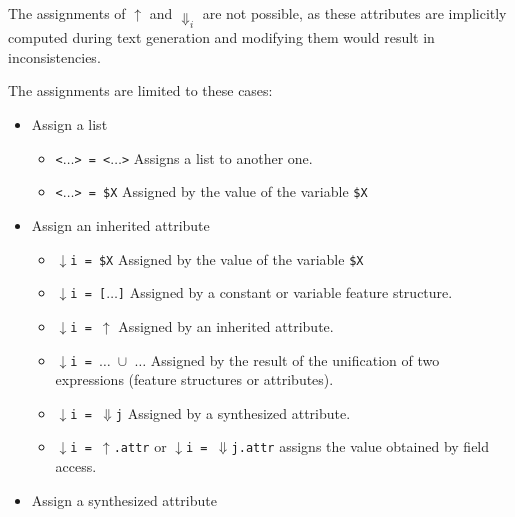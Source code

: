 \documentclass[11pt]{article}
\begin{document}
\begin{itemize}
	      The assignments of $\uparrow$ and $\Downarrow_i$ are not
	      possible, as these attributes are implicitly computed during text
	      generation and modifying them would result in
	      inconsistencies.

	      The assignments are limited to these cases:
	      \begin{itemize}

		      \item Assign a list

		            \begin{itemize}
			            \item  \verb#<#$\dots$\verb#> = <#$\dots$\verb#># Assigns a list to
			                  another one.
			            \item \verb#<#$\dots$\verb#> = $X# Assigned by the value of the
			                  variable \verb#$X#
		            \end{itemize}

		      \item Assign an inherited attribute

		            \begin{itemize}
			            \item $\downarrow$\verb#i = $X# Assigned by the value of the
			                  variable \verb#$X#
			            \item $\downarrow$\verb#i = [#$\dots$\verb#]# Assigned by a
			                  constant or variable feature structure.
			            \item $\downarrow$\verb#i = #$\uparrow$ Assigned by an inherited attribute.
			            \item $\downarrow$\verb#i = #$\dots$\verb# #$\cup$\verb# #$\dots$
			                  Assigned by the result of the unification of two expressions
			                  (feature structures or attributes).
			            \item $\downarrow$\verb#i = #$\Downarrow$\verb#j# Assigned by a
			                  synthesized attribute.
			            \item $\downarrow$\verb#i = #$\uparrow$\verb#.attr# or
			                  $\downarrow$\verb#i = #$\Downarrow$\verb#j.attr# assigns the value obtained
			                  by field access.
		            \end{itemize}

		      \item Assign a synthesized attribute


\end{itemize}
\end{itemize}
\end{document}
